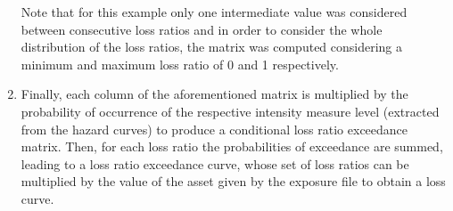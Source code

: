 \begin{enumerate}
Note that for this example only one intermediate value was considered between consecutive loss ratios and in order to consider the whole distribution of the loss ratios, the matrix was computed considering a minimum and maximum loss ratio of 0 and 1 respectively.

\item Finally, each column of the aforementioned matrix is multiplied by the probability of occurrence of the respective intensity measure level (extracted from the hazard curves) to produce a conditional loss ratio exceedance matrix.  Then, for each loss ratio the probabilities of exceedance are summed, leading to a loss ratio exceedance curve, whose set of loss ratios can be multiplied by the value of the asset given by the exposure file to obtain a loss curve.

\end{enumerate}
